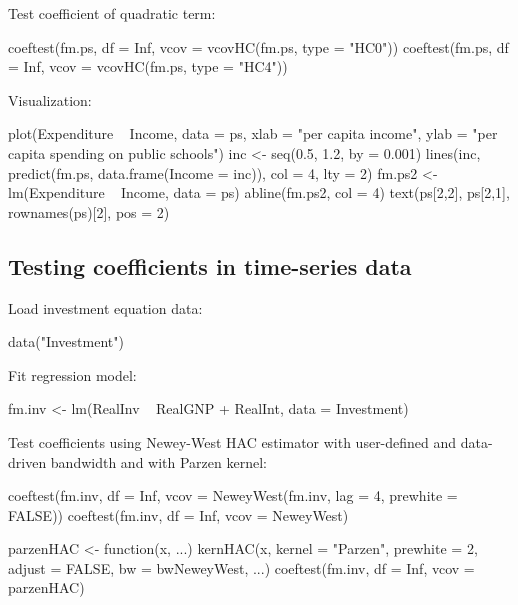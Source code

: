 \documentclass{Z}
\begin{document}
\begin{appendix}
Test coefficient of quadratic term:
\begin{Schunk}
\begin{Sinput}
  coeftest(fm.ps, df = Inf, vcov = vcovHC(fm.ps, type = "HC0"))
  coeftest(fm.ps, df = Inf, vcov = vcovHC(fm.ps, type = "HC4"))
\end{Sinput}
\end{Schunk}

Visualization: %
\begin{Schunk}
\begin{Sinput}
  plot(Expenditure ~ Income, data = ps,
    xlab = "per capita income",
    ylab = "per capita spending on public schools")
  inc <- seq(0.5, 1.2, by = 0.001)
  lines(inc, predict(fm.ps, data.frame(Income = inc)), col = 4, lty = 2)
  fm.ps2 <- lm(Expenditure ~ Income, data = ps)
  abline(fm.ps2, col = 4)
  text(ps[2,2], ps[2,1], rownames(ps)[2], pos = 2)
\end{Sinput}
\end{Schunk}

\subsection{Testing coefficients in time-series data}

Load investment equation data:
\begin{Schunk}
\begin{Sinput}
  data("Investment")
\end{Sinput}
\end{Schunk}

Fit regression model:
\begin{Schunk}
\begin{Sinput}
  fm.inv <- lm(RealInv ~ RealGNP + RealInt, data = Investment)
\end{Sinput}
\end{Schunk}

Test coefficients using Newey-West HAC estimator with user-defined and data-driven bandwidth
and with Parzen kernel:
\begin{Schunk}
\begin{Sinput}
  coeftest(fm.inv, df = Inf, vcov = NeweyWest(fm.inv, lag = 4, prewhite = FALSE))
  coeftest(fm.inv, df = Inf, vcov = NeweyWest)

  parzenHAC <- function(x, ...) kernHAC(x, kernel = "Parzen", prewhite = 2,
    adjust = FALSE, bw = bwNeweyWest, ...)
  coeftest(fm.inv, df = Inf, vcov = parzenHAC)
\end{Sinput}
\end{Schunk}


\end{appendix}
\end{document}
